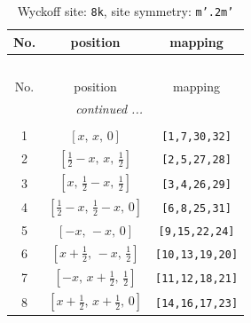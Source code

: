 \documentclass[fleqn,8pt]{jsarticle}
\begin{document}
\begin{longtable}{ccc}
\caption{Wyckoff site: {\tt 8k}, site symmetry: {\tt m'.2m'}}
 \\
 \hline \hline
No. & position & mapping \\ \hline \endfirsthead

\multicolumn{2}{l}{\tablename\ \thetable{}} \\
 \hline \hline
No. & position & mapping \\ \hline \endhead

 \hline \hline
\multicolumn{2}{r}{\footnotesize\it continued ...} \\ \endfoot

 \hline \hline
\multicolumn{2}{r}{} \\ \endlastfoot

1 & $\left[ x,\, x,\, 0 \right]$ & {\tt [1,7,30,32]} \\ \hline
2 & $\left[ \frac{1}{2} - x,\, x,\, \frac{1}{2} \right]$ & {\tt [2,5,27,28]} \\ \hline
3 & $\left[ x,\, \frac{1}{2} - x,\, \frac{1}{2} \right]$ & {\tt [3,4,26,29]} \\ \hline
4 & $\left[ \frac{1}{2} - x,\, \frac{1}{2} - x,\, 0 \right]$ & {\tt [6,8,25,31]} \\ \hline
5 & $\left[ - x,\, - x,\, 0 \right]$ & {\tt [9,15,22,24]} \\ \hline
6 & $\left[ x + \frac{1}{2},\, - x,\, \frac{1}{2} \right]$ & {\tt [10,13,19,20]} \\ \hline
7 & $\left[ - x,\, x + \frac{1}{2},\, \frac{1}{2} \right]$ & {\tt [11,12,18,21]} \\ \hline
8 & $\left[ x + \frac{1}{2},\, x + \frac{1}{2},\, 0 \right]$ & {\tt [14,16,17,23]} \\
\end{longtable}
\renewcommand{\arraystretch}{1.2}
\end{document}
